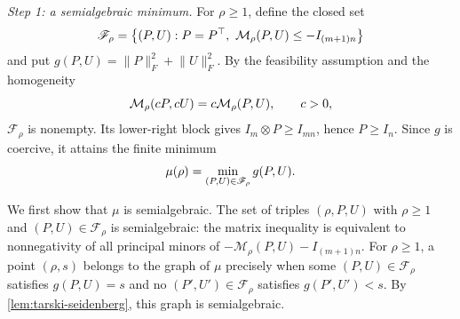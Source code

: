 \documentclass[twocolumn]{autart}
\begin{document}
\begin{pf}
\emph{Step 1: a semialgebraic minimum.}
For $\rho\geq1$, define the closed set\vspace{-2mm}
\begin{equation*}
\mathscr F_\rho=
\bigl\{(P,U):P=P^{\top},\ \mathcal M_\rho(P,U)\leq -I_{(m+1)n}\bigr\}\vspace{-2mm}
\end{equation*}
and put $g(P,U)=\lVert P\rVert_F^2+\lVert U\rVert_F^2$. By the
feasibility assumption and the homogeneity\vspace{-2mm}
\begin{equation*}
\mathcal M_\rho(cP,cU)=c\mathcal M_\rho(P,U),\qquad c>0,\vspace{-2mm}
\end{equation*}
$\mathscr F_\rho$ is nonempty. Its lower-right block gives
$I_m\otimes P\geq  I_{mn}$, hence $P\geq  I_n$. Since $g$ is
coercive, it attains the finite minimum\vspace{-3mm}
\begin{equation*}
\mu(\rho)=\min_{(P,U)\in\mathscr F_\rho}g(P,U).\vspace{-3mm}
\end{equation*}

We first show that $\mu$ is semialgebraic. The set of triples
$(\rho,P,U)$ with $\rho\geq1$ and $(P,U)\in\mathscr F_\rho$ is
semialgebraic: the matrix inequality is equivalent to nonnegativity of all
principal minors of $-\mathcal M_\rho(P,U)-I_{(m+1)n}$. For
$\rho\geq1$, a point $(\rho,s)$ belongs to the graph of $\mu$
precisely when some $(P,U)\in\mathscr F_\rho$ satisfies $g(P,U)=s$ and
no $(P',U')\in\mathscr F_\rho$ satisfies $g(P',U')<s$.
By \cref{lem:tarski-seidenberg}, this graph is semialgebraic.

 


\end{pf}
\end{document}
